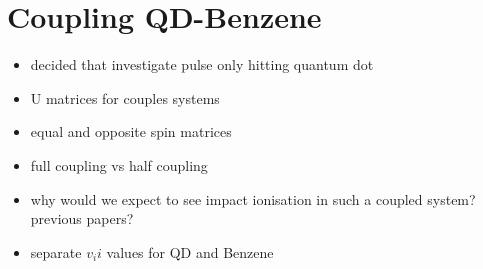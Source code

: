 \section{Coupling QD-Benzene}
\begin{itemize}
    \item decided that investigate pulse only hitting quantum dot
    \item U matrices for couples systems
    \item equal and opposite spin matrices
    \item full coupling vs half coupling
    \item {\color{red} why would we expect to see impact ionisation in such a coupled system? previous papers?}
    \item separate $v_ii$ values for QD and Benzene
\end{itemize}

\usetikzlibrary{matrix, positioning}

\newcommand{\my}{|[fill=myellow]|}
\renewcommand{\mg}{|[fill=mgreen]|}



